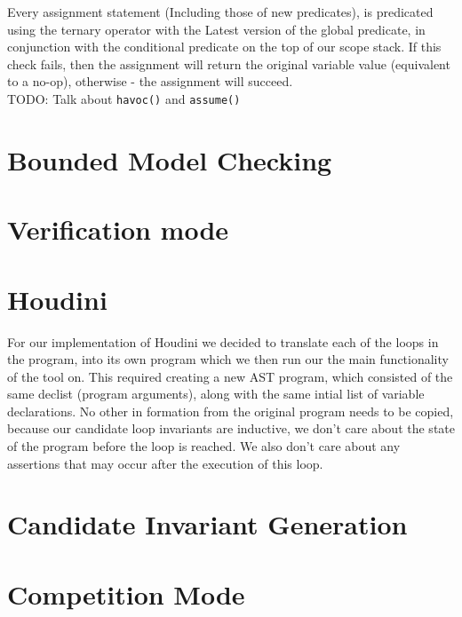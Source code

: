 \documentclass[11pt]{article}
\begin{document}
Every assignment statement (Including those of new predicates), is predicated using the ternary operator
with the Latest version of the global predicate, in conjunction with the conditional predicate on the
top of our scope stack. If this check fails, then the assignment will return the original variable value
(equivalent to a no-op), otherwise - the assignment will succeed. \\

TODO: Talk about \verb|havoc()| and \verb|assume()|

\section{Bounded Model Checking}
\section{Verification mode}
\section{Houdini}

For our implementation of Houdini we decided to translate each of the loops in the program, into its own
program which we then run our the main functionality of the tool on. This required creating a new AST
program, which consisted of the same declist (program arguments), along with the same intial list of
variable declarations. No other in formation from the original program needs to be copied, because our
candidate loop invariants are inductive, we don't care about the state of the program before the loop
is reached. We also don't care about any assertions that may occur after the execution of this loop.

\section{Candidate Invariant Generation}
\section{Competition Mode}
\end{document}
